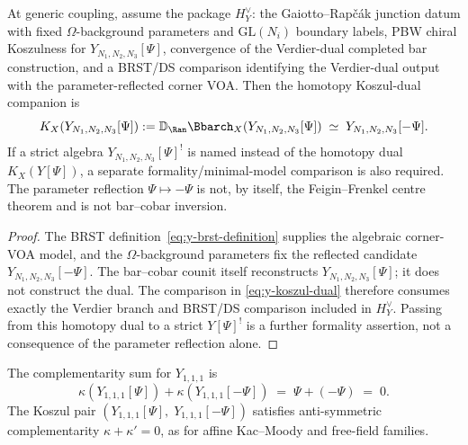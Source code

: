 \begin{proposition}%
\label{prop:y-koszul-dual}
At generic coupling, assume the package \(H_Y^\vee\): the
Gaiotto--Rap\v{c}\'ak junction datum with fixed \(\Omega\)-background
parameters and \(\mathrm{GL}(N_i)\) boundary labels, PBW chiral
Koszulness for \(Y_{N_1,N_2,N_3}[\Psi]\), convergence of the
Verdier-dual completed bar construction, and a BRST/DS comparison
identifying the Verdier-dual output with the parameter-reflected corner
VOA.  Then the homotopy Koszul-dual companion is
\begin{equation}\label{eq:y-koszul-dual}
K_X\!\left(Y_{N_1,N_2,N_3}[\Psi]\right)
 :=
\mathbb D_{\Ran}\Bbarch_X\!\left(Y_{N_1,N_2,N_3}[\Psi]\right)
\;\simeq\;
Y_{N_1,N_2,N_3}[-\Psi].
\end{equation}
If a strict algebra \(Y_{N_1,N_2,N_3}[\Psi]^!\) is named instead of
the homotopy dual \(K_X(Y[\Psi])\), a separate formality/minimal-model
comparison is also required.  The parameter reflection
\(\Psi\mapsto-\Psi\) is not, by itself, the Feigin--Frenkel centre
theorem and is not bar--cobar inversion.
\end{proposition}

\begin{proof}
The BRST definition~\eqref{eq:y-brst-definition} supplies the
algebraic corner-VOA model, and the \(\Omega\)-background parameters
fix the reflected candidate \(Y_{N_1,N_2,N_3}[-\Psi]\).  The
bar--cobar counit itself reconstructs \(Y_{N_1,N_2,N_3}[\Psi]\);
it does not construct the dual.  The comparison in
\eqref{eq:y-koszul-dual} therefore consumes exactly the Verdier branch
and BRST/DS comparison included in \(H_Y^\vee\).  Passing from this
homotopy dual to a strict \(Y[\Psi]^!\) is a further formality
assertion, not a consequence of the parameter reflection alone.
\end{proof}

\begin{proposition}%
\label{prop:y-complementarity}
The complementarity sum for $Y_{1,1,1}$ is
\begin{equation}\label{eq:y111-complementarity}
\kappa(Y_{1,1,1}[\Psi]) + \kappa(Y_{1,1,1}[-\Psi])
\;=\; \Psi + (-\Psi) \;=\; 0.
\end{equation}
The Koszul pair $(Y_{1,1,1}[\Psi],\; Y_{1,1,1}[-\Psi])$
satisfies anti-symmetric complementarity $\kappa + \kappa' = 0$,
as for affine Kac--Moody and free-field families.
\end{proposition}

